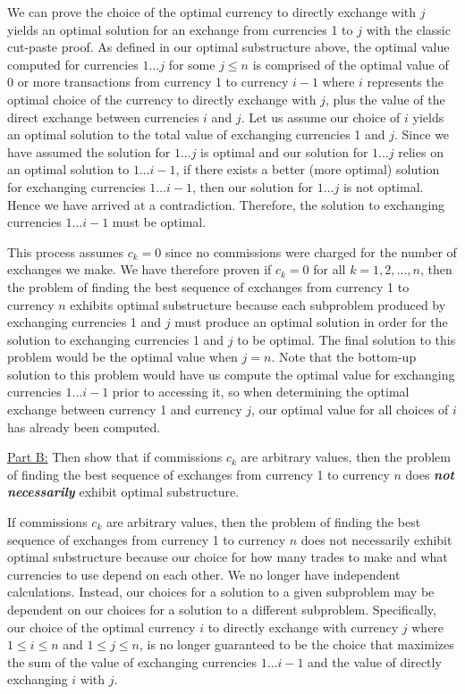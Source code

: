 \documentclass[11pt]{article}
\begin{document}
We can prove the choice of the optimal currency to directly exchange with $j$ yields an optimal solution for an exchange from currencies 1 to $j$ with the classic cut-paste proof. As defined in our optimal substructure above, the optimal value computed for currencies $1...j$ for some $j \leq n$ is comprised of the optimal value of 0 or more transactions from currency 1 to currency $i-1$ where $i$ represents the optimal choice of the currency to directly exchange with $j$, plus the value of the direct exchange between currencies $i$ and $j$. Let us assume our choice of $i$ yields an optimal solution to the total value of exchanging currencies 1 and $j$. Since we have assumed the solution for $1...j$ is optimal and our solution for $1...j$ relies on an optimal solution to $1...i-1$, if there exists a better (more optimal) solution for exchanging currencies $1...i-1$, then our solution for $1...j$ is not optimal. Hence we have arrived at a contradiction. Therefore, the solution to exchanging currencies $1...i-1$ must be optimal.

This process assumes $c_k = 0$ since no commissions were charged for the number of exchanges we make. We have therefore proven if $c_k = 0$ for all $k = 1, 2, ..., n$, then the problem of finding the best sequence of exchanges from currency 1 to currency $n$ exhibits optimal substructure because each subproblem produced by exchanging currencies 1 and $j$ must produce an optimal solution in order for the solution to exchanging currencies 1 and $j$ to be optimal. The final solution to this problem would be the optimal value when $j = n$. Note that the bottom-up solution to this problem would have us compute the optimal value for exchanging currencies $1...i-1$ prior to accessing it, so when determining the optimal exchange between currency 1 and currency $j$, our optimal value for all choices of $i$ has already been computed.

\underline{Part B:} Then show that if commissions $c_k$ are arbitrary values, then the problem of finding the best sequence of exchanges from currency 1 to currency $n$ does \textbf{\textit{not necessarily}} exhibit optimal substructure.

If commissions $c_k$ are arbitrary values, then the problem of finding the best sequence of exchanges from currency 1 to currency $n$ does not necessarily exhibit optimal substructure because our choice for how many trades to make and what currencies to use depend on each other. We no longer have independent calculations. Instead, our choices for a solution to a given subproblem may be dependent on our choices for a solution to a different subproblem. Specifically, our choice of the optimal currency $i$ to directly exchange with currency $j$ where $1 \leq i \leq n$ and $1 \leq j \leq n$, is no longer guaranteed to be the choice that maximizes the sum of the value of exchanging currencies $1...i-1$ and the value of directly exchanging $i$ with $j$.
\end{document}
